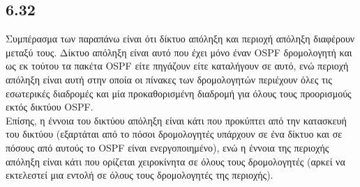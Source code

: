 \documentclass[a4paper, 12pt]{article}
\begin{document}
	\subsection*{6.32}
		Συμπέρασμα των παραπάνω είναι ότι δίκτυο απόληξη και περιοχή απόληξη διαφέρουν μεταξύ τους. Δίκτυο απόληξη είναι αυτό που έχει μόνο έναν OSPF δρομολογητή και ως εκ τούτου τα πακέτα OSPF είτε πηγάζουν είτε καταλήγουν σε αυτό, ενώ περιοχή απόληξη είναι αυτή στην οποία οι πίνακες των δρομολογητών περιέχουν όλες τις εσωτερικές διαδρομές και μία προκαθορισμένη διαδρομή για όλους τους προορισμούς εκτός δικτύου OSPF. \\ 
		
		Επίσης, η έννοια του δικτύου απόληξη είναι κάτι που προκύπτει από την κατασκευή του δικτύου (εξαρτάται από το πόσοι δρομολογητές υπάρχουν σε ένα δίκτυο και σε πόσους από αυτούς το OSPF είναι ενεργοποιημένο), ενώ η έννοια της περιοχής απόληξη είναι κάτι που ορίζεται χειροκίνητα σε όλους τους δρομολογητές (αρκεί να εκτελεστεί μια εντολή σε όλους τους δρομολογητές της περιοχής).
\end{document}
